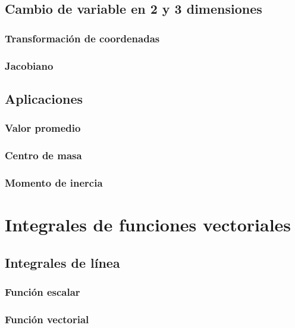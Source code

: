 \documentclass[12pt, fleqn]{report}                             %
\begin{document}
        \section{Cambio de variable en 2 y 3 dimensiones}
        
            \subsection{Transformación de coordenadas}
            
            \subsection{Jacobiano}
            
        \section{Aplicaciones}
        
            \subsection{Valor promedio}
            
            \subsection{Centro de masa}
            
            \subsection{Momento de inercia}
        
    \chapter{Integrales de funciones vectoriales}
    
        \section{Integrales de línea}
        
            \subsection{Función escalar}
            
            \subsection{Función vectorial}
            
\end{document}
